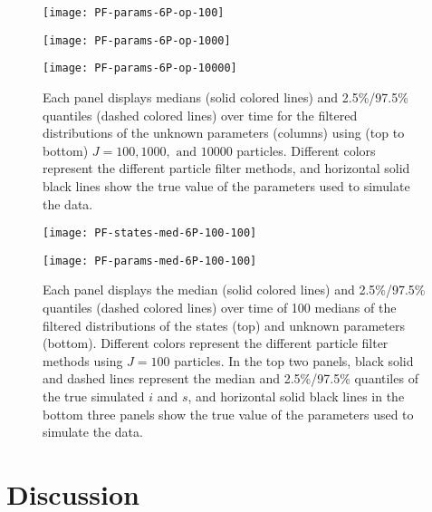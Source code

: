 \documentclass{article}
\begin{document}
\begin{figure}[ht]
\centering
\begin{minipage}{1.1\linewidth}
\texttt{[image: PF-params-6P-op-100]}
\end{minipage}
\begin{minipage}{1.1\linewidth}
\texttt{[image: PF-params-6P-op-1000]}
\end{minipage}
\begin{minipage}{1.1\linewidth}
\texttt{[image: PF-params-6P-op-10000]}
\end{minipage}
\caption{Each panel displays medians (solid colored lines) and 2.5\%/97.5\% quantiles (dashed colored lines) over time for the filtered distributions of the unknown parameters (columns) using (top to bottom) $J = 100, 1000, \mbox{ and } 10000$ particles.  Different colors represent the different particle filter methods, and horizontal solid black lines show the true value of the parameters used to simulate the data.} \label{fig:params6Pop}
\end{figure}

\begin{figure}[ht]
\centering
\begin{minipage}{1.0\linewidth}
\texttt{[image: PF-states-med-6P-100-100]}
\end{minipage}
\begin{minipage}{1.1\linewidth}
\texttt{[image: PF-params-med-6P-100-100]}
\end{minipage}
\caption{Each panel displays the median (solid colored lines) and 2.5\%/97.5\% quantiles (dashed colored lines) over time of 100 medians of the filtered distributions of the states (top) and unknown parameters (bottom).  Different colors represent the different particle filter methods using $J = 100$ particles.  In the top two panels, black solid and dashed lines represent the median and 2.5\%/97.5\% quantiles of the true simulated $i$ and $s$, and horizontal solid black lines in the bottom three panels show the true value of the parameters used to simulate the data.} \label{fig:meds}
\end{figure}

\section{Discussion \label{sec:discussion}}



\end{document}
